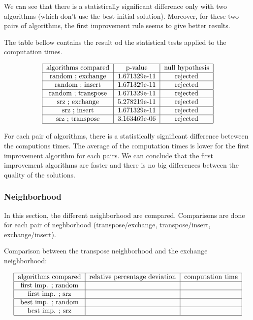\documentclass{article}
\begin{document}
We can see that there is a statistically significant difference only with two algorithms (which don't use the best initial solution).
Moreover, for these two pairs of algorithms, the first improvement rule seems to give better results. \newline

The table bellow contains the result od the statistical tests applied to the computation times.

\begin{align*}
\begin{tabular} {|c|c|c|} \hline
    algorithms compared & p-value & null hypothesis \\ \hline
    random ; exchange & 1.671329e-11 & rejected \\ \hline
    random ; insert & 1.671329e-11 & rejected \\ \hline
    random ; transpose & 1.671329e-11 & rejected \\ \hline
    srz ; exchange &5.278219e-11  & rejected \\ \hline
    srz ; insert & 1.671329e-11 & rejected \\ \hline
    srz ; transpose & 3.163469e-06 & rejected \\ \hline
\end{tabular}
\end{align*}

For each pair of algorithms, there is a statistically significant difference beteween the computions times.
The average of the computation times is lower for the first improvement algorithm for each pairs.
We can conclude that the first improvement algorithms are faster and there is no big differences between the quality of the solutions.

\subsubsection{Neighborhood}

In this section, the different neighborhood are compared. Comparisons are done for each pair of neghborhood (transpose/exchange, transpose/insert, exchange/insert). \newline

Comparison between the transpose neighborhood and the exchange neighborhood:

\begin{align*}
\begin{tabular} {|c|c|c|c|c|} \hline
    algorithms compared & relative percentage deviation & computation time \\ \hline
    first imp. ; random & & \\ \hline
    first imp. ; srz & & \\ \hline
    best imp. ; random & & \\ \hline
    best imp. ; srz & & \\ \hline
\end{tabular}
\end{align*}
\end{document}
